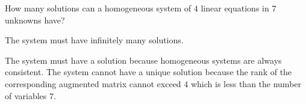 \documentclass{ximera}
\begin{document}
\begin{exercise} \label{A.3.4.1}
How many solutions can a homogeneous system of $4$ linear equations in $7$ unknowns have?

\begin{solution}
\ans The system must have infinitely many solutions.

The system must have a solution because homogeneous systems are always consistent.
The system cannot have a unique solution because the rank of the corresponding augmented matrix cannot exceed $4$ which is less than the number of variables $7$.
\end{solution}
\end{exercise}
\end{document}
